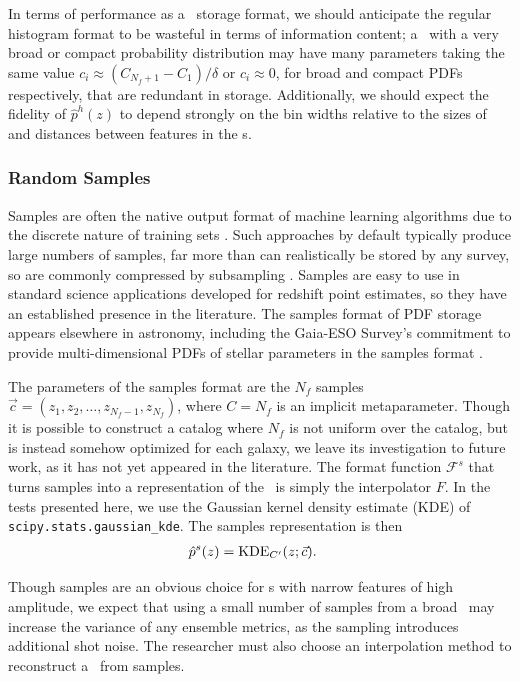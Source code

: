 In terms of performance as a \pz\ storage format, we should anticipate the 
regular histogram format to be wasteful in terms of information content; a \pz\ 
with a very broad or compact probability distribution may have many parameters 
taking the same value $c_{i} \approx (C_{N_{f}+1} - C_{1}) / \delta$ or $c_{i} 
\approx 0$, for broad and compact PDFs respectively, that are redundant in 
storage.
Additionally, we should expect the fidelity of $\hat{p}^{h}(z)$ to depend 
strongly on the bin widths relative to the sizes of and distances between 
features in the \pz s.

\subsubsection{Random Samples}

Samples are often the native output format of machine learning algorithms due 
to the discrete nature of training sets \citep{de_vicente_dnf_2016}.
Such approaches by default typically produce large numbers of samples, far more 
than can realistically be stored by any survey, so are commonly compressed by 
subsampling \citep{hoyle_dark_2017}.
Samples are easy to use in standard science applications developed for redshift 
point estimates, so they have an established presence in the literature\citep 
{bonnett_redshift_2016}.
The samples format of PDF storage appears elsewhere in astronomy, including the 
Gaia-ESO Survey's commitment to provide multi-dimensional PDFs of stellar 
parameters in the samples format \citep{bailer-jones_gaia_2013}.

The parameters of the samples format are the $N_{f}$ samples $\vec{c}=(z_{1}, 
z_{2}, \dots, z_{N_{f}-1}, z_{N_{f}})$, where $C=N_{f}$ is an implicit 
metaparameter.
Though it is possible to construct a catalog where $N_{f}$ is not uniform over 
the catalog, but is instead somehow optimized for each galaxy, we leave its 
investigation to future work, as it has not yet appeared in the literature.
The format function $\mathcal{F}^{s}$ that turns samples into a representation 
of the \pz\ is simply the interpolator $F$.
In the tests presented here, we use the Gaussian kernel density estimate (KDE) 
of \texttt{scipy.stats.gaussian\_kde}.
The samples representation is then
\begin{align}
\eqlabel{eq:sampled}
\hat{p}^{s}(z) &= \mathrm{KDE}_{C'}(z; \vec{c}).
\end{align}

Though samples are an obvious choice for \pz s with narrow features of high 
amplitude, we expect that using a small number of samples from a broad \pz\ may 
increase the variance of any ensemble metrics, as the sampling introduces 
additional shot noise.
The researcher must also choose an interpolation method to reconstruct a \pz\ 
from samples.

